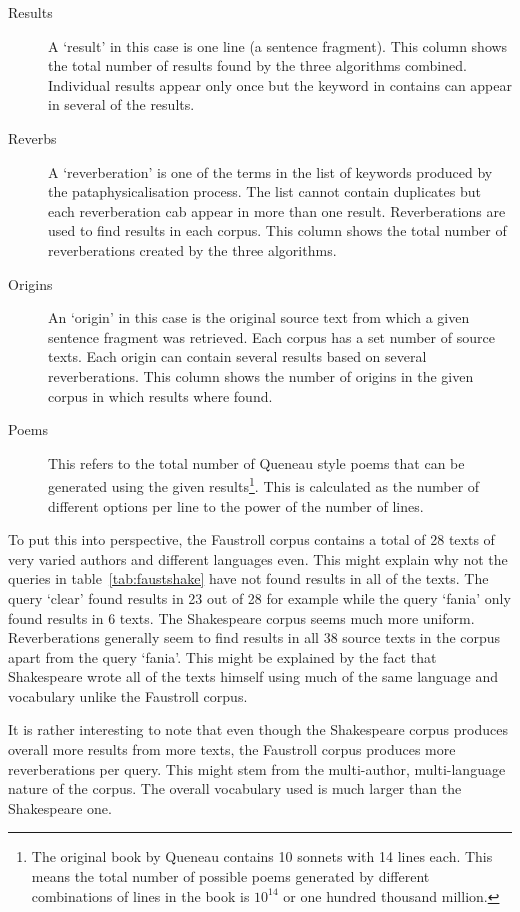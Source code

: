 \begin{description}
  \item[Results] A `result' in this case is one line (a sentence fragment). This column shows the total number of results found by the three algorithms combined. Individual results appear only once but the keyword in contains can appear in several of the results.
  \item[Reverbs] A `reverberation' is one of the terms in the list of keywords produced by the pataphysicalisation process. The list cannot contain duplicates but each reverberation cab appear in more than one result. Reverberations are used to find results in each corpus. This column shows the total number of reverberations created by the three algorithms.
  \item[Origins] An `origin' in this case is the original source text from which a given sentence fragment was retrieved. Each corpus has a set number of source texts. Each origin can contain several results based on several reverberations. This column shows the number of origins in the given corpus in which results where found.
  \item[Poems] This refers to the total number of Queneau style poems that can be generated using the given results\footnote{The original book by Queneau contains \num{10} sonnets with \num{14} lines each. This means the total number of possible poems generated by different combinations of lines in the book is $10^{14}$ or one hundred thousand million.}. This is calculated as the number of different options per line to the power of the number of lines.
\end{description}

To put this into perspective, the Faustroll corpus contains a total of \num{28} texts of very varied authors and different languages even. This might explain why not the queries in table~\ref{tab:faustshake} have not found results in all of the texts. The query `clear' found results in \num{23} out of \num{28} for example while the query `fania' only found results in \num{6} texts. The Shakespeare corpus seems much more uniform. Reverberations generally seem to find results in all \num{38} source texts in the corpus apart from the query `fania'. This might be explained by the fact that Shakespeare wrote all of the texts himself using much of the same language and vocabulary unlike the Faustroll corpus. 

It is rather interesting to note that even though the Shakespeare corpus produces overall more results from more texts, the Faustroll corpus produces more reverberations per query. This might stem from the multi-author, multi-language nature of the corpus. The overall vocabulary used is much larger than the Shakespeare one.

